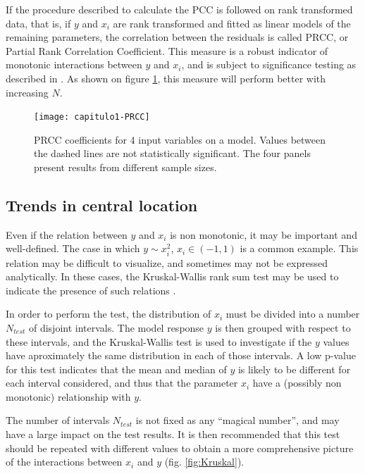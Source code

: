 If the procedure described to calculate the PCC is followed on rank transformed
data, that is, if $y$ and $x_i$ are rank transformed and fitted as linear models
of the remaining parameters, the correlation between the residuals is called
PRCC, or Partial Rank Correlation Coefficient. This measure is a robust
indicator of monotonic interactions between $y$ and $x_i$, and is subject
to significance testing as described in \cite{Marino08}. As shown on figure
\ref{fig:PRCC}, this measure will perform better with increasing $N$.

\begin{figure}[htbp]
	\begin{center}
\texttt{[image: capitulo1-PRCC]}
	\end{center}
	\caption{PRCC coefficients for 4 input variables on a model. Values
	between the dashed lines are not statistically significant. The 
	four panels 
	present results from different sample sizes.}
	\label{fig:PRCC}
\end{figure}

\subsection{Trends in central location}
Even if the relation between $y$ and $x_i$ is non monotonic, it may be 
important and well-defined. The case in which $y \sim x_i^2$, $x_i \in (-1,1)$
is a common example. This relation may be difficult to visualize, and sometimes
may not be expressed analytically. In these cases, the Kruskal-Wallis rank
sum test may be used to indicate the presence of such relations 
\cite{Kleijnen99}.

In order to perform the test, the distribution of $x_i$ must be divided 
into a number $N_{test}$ of disjoint intervals. The model response $y$ is then
grouped with respect to these intervals, and the Kruskal-Wallis test is used
to investigate if the $y$ values have aproximately the same distribution
in each of those intervals. A low p-value for this test indicates that the
mean and median of $y$ is likely to be different for each interval considered,
and thus that the parameter $x_i$ have a (possibly non monotonic) relationship
with $y$.

The number of intervals $N_{test}$ is not fixed as any ``magical number'', and
may have a large impact on the test results. It is then recommended that 
this test should be repeated with different values to obtain a more 
comprehensive picture of the interactions between $x_i$ and $y$ (fig. \ref{fig:Kruskal}).

